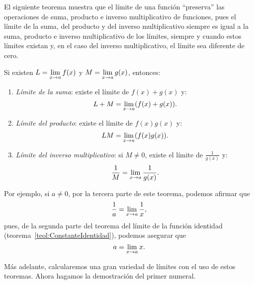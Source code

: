 El siguiente teorema muestra que el límite de una función ``preserva'' las operaciones de suma,
producto e inverso multiplicativo de funciones, pues el límite de la suma, del producto y del
inverso multiplicativo siempre es igual a la suma, producto e inverso multiplicativo de los
límites, siempre y cuando estos límites existan y, en el caso del inverso multiplicativo, el límite
sea diferente de cero.

\begin{teocal}\label{teol:Algebra} Si existen $L = \displaystyle
\limjc{f(x)}{x}{a}$ y $M = \displaystyle \limjc{g(x)}{x}{a}$, entonces:
\begin{enumerate}
\item \emph{Límite de la suma}: existe el límite de $f(x) + g(x)$ y:
\[
    L + M = \limjc{(f(x)+ g(x))}{x}{a}.
\]
\item \emph{Límite del producto}: existe el límite de $f(x)g(x)$ y:
\[
LM = \limjc{(f(x)g(x))}{x}{a}.
\]
\item \emph{Límite del inverso multiplicativo}: si $M\neq 0$, existe el límite de
    $\displaystyle{\frac{1}{g(x)}}$ y:
\[
\frac{1}{M} = \limjc{\frac{1}{g(x)}}{x}{a}.
\]
\end{enumerate}
\end{teocal}

Por ejemplo, si $a\neq 0$, por la tercera parte de este teorema, podemos afirmar que
\[
\frac{1}{a} = \limjc{\frac{1}{x}}{x}{a},
\]
pues, de la segunda parte del teorema del límite de la función identidad
(teorema~\ref{teol:ConstanteIdentidad}), podemos asegurar que
\[
a = \limjc{x}{x}{a}.
\]

Más adelante, calcularemos una gran variedad de límites con el uso de estos teoremas. Ahora hagamos
la demostración del primer numeral.

